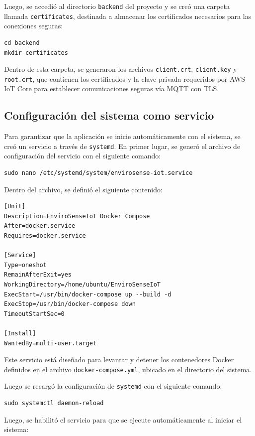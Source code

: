 Luego, se accedió al directorio \texttt{backend} del proyecto y se creó una
carpeta llamada \texttt{certificates}, destinada a almacenar los certificados
necesarios para las conexiones seguras:

\begin{verbatim}
cd backend
mkdir certificates
\end{verbatim}

Dentro de esta carpeta, se generaron los archivos \texttt{client.crt},
\texttt{client.key} y \texttt{root.crt}, que contienen los certificados y la
clave privada requeridos por AWS IoT Core para establecer comunicaciones
seguras vía MQTT con TLS.

\subsection{Configuración del sistema como servicio}

Para garantizar que la aplicación se inicie automáticamente con el sistema, se
creó un servicio a través de \texttt{systemd}. En primer lugar, se generó el
archivo de configuración del servicio con el siguiente comando:

\begin{verbatim}
sudo nano /etc/systemd/system/envirosense-iot.service
\end{verbatim}

Dentro del archivo, se definió el siguiente contenido:

\begin{verbatim}
[Unit]
Description=EnviroSenseIoT Docker Compose
After=docker.service
Requires=docker.service

[Service]
Type=oneshot
RemainAfterExit=yes
WorkingDirectory=/home/ubuntu/EnviroSenseIoT
ExecStart=/usr/bin/docker-compose up --build -d
ExecStop=/usr/bin/docker-compose down
TimeoutStartSec=0

[Install]
WantedBy=multi-user.target
\end{verbatim}

Este servicio está diseñado para levantar y detener los contenedores Docker
definidos en el archivo \texttt{docker-compose.yml}, ubicado en el directorio
del sistema.

Luego se recargó la configuración de \texttt{systemd} con el siguiente comando:

\begin{verbatim}
sudo systemctl daemon-reload
\end{verbatim}

Luego, se habilitó el servicio para que se ejecute automáticamente al iniciar
el sistema:

